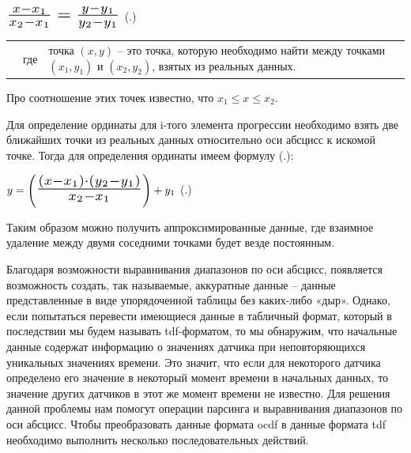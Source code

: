 {  \formulaspace \par \redline 
    $\scaleto{\frac{x - x_1}{x_2 - x_1} = \frac{y - y_1}{y_2 - y_1}}{22pt}$
    \hfill (\thechaptercntr .\theformulacntr) \redline
  \formulaspace \addtocounter{formulacntr}{1}

  \begin{tabular}{p{}p{}p{}}
		& где  & точка $\left(x, y\right)$ {--} это точка, которую необходимо найти между точками $\left(x_1, y_1\right)$ и $\left(x_2, y_2\right)$, взятых из реальных данных. \\
  \end{tabular}

  \par \redline Про соотношение этих точек известно, что $x_1 \leq x \leq x_2$. 

  \par \redline Для определение ординаты для i-того элемента прогрессии необходимо взять две ближайших точки из реальных данных относительно оси абсцисс к искомой точке. Тогда для определения ординаты имеем формулу (\thechaptercntr .\theformulacntr):

  \formulaspace \par \redline 
    $y = \left(\scaleto{\frac{\left(x - x_1\right) \cdot \left(y_2 - y_1\right)}{x_2 - x_1}}{24pt}\right) + y_1$
    \hfill (\thechaptercntr .\theformulacntr) \redline
  \formulaspace \addtocounter{formulacntr}{1}

  \par \redline Таким образом можно получить аппроксимированные данные, где взаимное удаление между двумя соседними точками будет везде постоянным.  

  \par \redline Благодаря возможности выравнивания диапазонов по оси абсцисс, появляется возможность создать, так называемые, аккуратные данные – данные представленные в виде упорядоченной таблицы без каких-либо «дыр». Однако, если попытаться перевести имеющиеся данные в табличный формат, который в последствии мы будем называть tdf-форматом, то мы обнаружим, что начальные данные содержат информацию о значениях датчика при неповторяющихся уникальных значениях времени. Это значит, что если для некоторого датчика определено его значение в некоторый момент времени в начальных данных, то значение других датчиков в этот же момент времени не известно. Для решения данной проблемы нам помогут операции парсинга и выравнивания диапазонов по оси абсцисс. Чтобы преобразовать данные формата ocdf в данные формата tdf необходимо выполнить несколько последовательных действий. 

}
